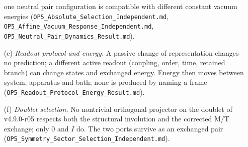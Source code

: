 \begin{enumerate}[leftmargin=2em]
one neutral pair configuration is compatible with different constant vacuum energies (\texttt{OP5\_Absolute\_\allowbreak Selection\_\allowbreak Independent.md},
\texttt{OP5\_Affine\_\allowbreak Vacuum\_\allowbreak Response\_\allowbreak Independent.md}, \texttt{OP5\_Neutral\_\allowbreak Pair\_\allowbreak Dynamics\_\allowbreak Result.md}).
\item[(e)] \emph{Readout protocol and energy.}  A passive change of representation changes no prediction; a different active readout (coupling, order,
time, retained branch) can change states and exchanged energy.  Energy then moves between system, apparatus and bath; none is produced by naming a
frame (\texttt{OP5\_Readout\_Protocol\_Energy\_Result.md}).
\item[(f)] \emph{Doublet selection.}  No nontrivial orthogonal projector on the doublet of v4.9.0-r05 respects both the structural involution and the
corrected M/T exchange; only \(0\) and \(I\) do.  The two ports survive as an exchanged pair (\texttt{OP5\_Symmetry\_Sector\_Selection\_Independent.md}).
\end{enumerate}

